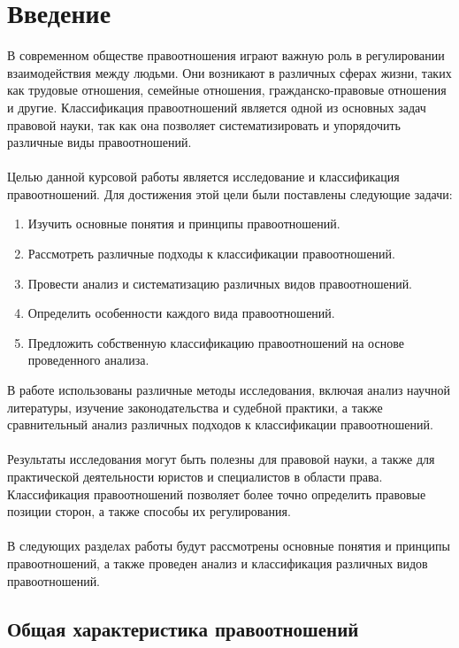 \documentclass{article}
\begin{document}
\section{Введение}
В современном обществе правоотношения играют важную роль в регулировании взаимодействия между людьми. Они возникают в различных сферах жизни, таких как трудовые отношения, семейные отношения, гражданско-правовые отношения и другие. Классификация правоотношений является одной из основных задач правовой науки, так как она позволяет систематизировать и упорядочить различные виды правоотношений.\\
~\\
Целью данной курсовой работы является исследование и классификация правоотношений. Для достижения этой цели были поставлены следующие задачи:
\begin{enumerate}
\item Изучить основные понятия и принципы правоотношений.
\item Рассмотреть различные подходы к классификации правоотношений.
\item Провести анализ и систематизацию различных видов правоотношений.
\item Определить особенности каждого вида правоотношений.
\item Предложить собственную классификацию правоотношений на основе проведенного анализа.
\end{enumerate}
В работе использованы различные методы исследования, включая анализ научной литературы, изучение законодательства и судебной практики, а также сравнительный анализ различных подходов к классификации правоотношений.\\
~\\
Результаты исследования могут быть полезны для правовой науки, а также для практической деятельности юристов и специалистов в области права. Классификация правоотношений позволяет более точно определить правовые позиции сторон, а также способы их регулирования.\\
~\\
В следующих разделах работы будут рассмотрены основные понятия и принципы правоотношений, а также проведен анализ и классификация различных видов правоотношений.
\subsection{Общая характеристика правоотношений}
\end{document}
